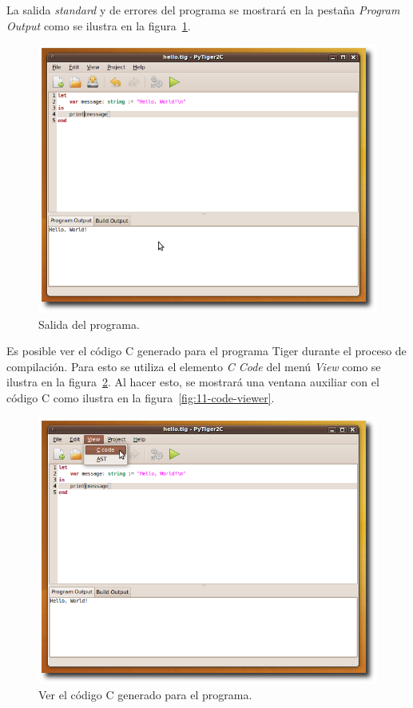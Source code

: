 \documentclass{article}
\begin{document}
\newpage

La salida \emph{standard} y de errores del programa se mostrará en la
pestaña \emph{Program Output} como se ilustra en la
figura~\ref{fig:9-program-output}.

\begin{figure}[htb]
  \centering
  \includegraphics[width=5.5in]{gui/9-program-output}
  \caption{Salida del programa.}
  \label{fig:9-program-output}
\end{figure}

\newpage

Es posible ver el código C generado para el programa Tiger durante el proceso de
compilación. Para esto se utiliza el elemento \emph{C Code} del menú \emph{View}
como se ilustra en la figura~\ref{fig:10-viewing-code}. Al hacer esto, se mostrará
una ventana auxiliar con el código C como ilustra en la
figura~\ref{fig:11-code-viewer}.

\begin{figure}[htb]
  \centering
  \includegraphics[width=5.5in]{gui/10-viewing-code}
  \caption{Ver el código C generado para el programa.}
  \label{fig:10-viewing-code}
\end{figure}
\end{document}
